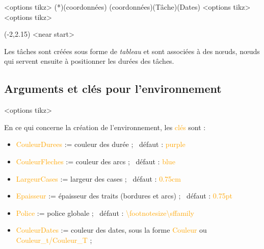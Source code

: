 \documentclass[french,a4paper,11pt]{article}
\newcommand\Cle[1]{{\small\sffamily\textlangle \textcolor{orange}{#1}\textrangle}}
\begin{document}
{\begin{DemoCode}
\begin{GrapheMPM}[clés]<options tikz>
	\MPMPlaceNotice(*)(coordonnées)
	\MPMPlaceTache(coordonnées)(Tâche)(Dates)
	<options tikz>
	<options tikz>
\end{GrapheMPM}
\end{DemoCode}

\begin{DemoCode}[]
\begin{GrapheMPM}
	\MPMPlaceNotice(-2,2.15)
	<near start>
\end{GrapheMPM}
\end{DemoCode}

\begin{tipblock}
Les tâches sont créées sous forme de \textit{tableau} et sont associées à des nœuds, nœuds qui servent ensuite à positionner les durées des tâches.
\end{tipblock}

\pagebreak

\subsection{Arguments et clés pour l'environnement}

\begin{DemoCode}
\begin{GrapheMPM}[clés]<options tikz>
\end{GrapheMPM}
\end{DemoCode}

\begin{tipblock}
En ce qui concerne la création de l'environnement, les \Cle{clés} sont :

\begin{itemize}
	\item \Cle{CouleurDurees} := couleur des durée ; \hfill~défaut : \Cle{purple}
	\item \Cle{CouleurFleches} := couleur des arcs ; \hfill~défaut : \Cle{blue}
	\item \Cle{LargeurCases} := largeur des cases ; \hfill~défaut : \Cle{0.75cm}
	\item \Cle{Epaisseur} := épaisseur des traits (bordures et arcs) ; \hfill~défaut : \Cle{0.75pt}
	\item \Cle{Police} := police globale ; \hfill~défaut : \Cle{\textbackslash footnotesize\textbackslash sffamily}
	\item \Cle{CouleurDates} := couleur des dates, sous la forme \Cle{Couleur} ou \Cle{Couleur\_t/Couleur\_T} ;
	

\end{itemize}
\end{tipblock}}
\end{document}

